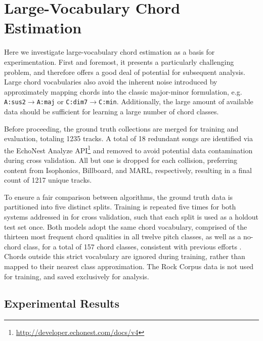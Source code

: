 \documentclass{article}
\begin{document}
\section{Large-Vocabulary Chord Estimation}
\label{sec:experiment}

Here we investigate large-vocabulary chord estimation as a basis for experimentation. %
First and foremost, it presents a particularly challenging problem, and therefore offers a good deal of potential for subsequent analysis.
Large chord vocabularies also avoid the inherent noise introduced by approximately mapping chords into the classic major-minor formulation, e.g. \texttt{A:sus2}$\to$\texttt{A:maj} or \texttt{C:dim7}$\to$\texttt{C:min}.
Additionally, the large amount of available data should be sufficient for learning a large number of chord classes.

Before proceeding, the ground truth collections are merged for training and evaluation, totaling 1235 tracks.
A total of 18 redundant songs are identified via the EchoNest Analyze API\footnote{\url{http://developer.echonest.com/docs/v4}} and removed to avoid potential data contamination during cross validation.
All but one is dropped for each collision, preferring content from Isophonics, Billboard, and MARL, respectively, resulting in a final count of 1217 unique tracks.

To ensure a fair comparison between algorithms, the ground truth data is partitioned into five distinct splits.
Training is repeated five times for both systems addressed in  for cross validation, such that each split is used as a holdout test set once.
Both models adopt the same chord vocabulary, comprised of the thirteen most frequent chord qualities in all twelve pitch classes, as well as a no-chord class, for a total of 157 chord classes, consistent with previous efforts \cite{Cho2014Improved}.
Chords outside this strict vocabulary are ignored during training, rather than mapped to their nearest class approximation.
The Rock Corpus data is not used for training, and saved exclusively for analysis.


\subsection{Experimental Results}
\label{subsec:experiment}
\end{document}
